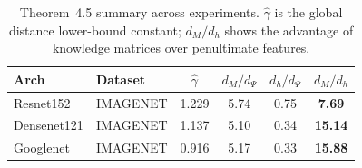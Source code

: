 \begin{table}[t]
\centering
\caption{Theorem~4.5 summary across experiments. $\hat{\gamma}$ is the global distance lower-bound constant; $d_M/d_h$ shows the advantage of knowledge matrices over penultimate features.}
\label{tab:theorem45_summary}
\begin{tabular}{llcccc}
\toprule
Arch & Dataset & $\hat{\gamma}$ & $d_M/d_\Psi$ & $d_h/d_\Psi$ & $d_M/d_h$ \\
\midrule
Resnet152 & IMAGENET & 1.229 & 5.74 & 0.75 & \textbf{7.69} \\
Densenet121 & IMAGENET & 1.137 & 5.10 & 0.34 & \textbf{15.14} \\
Googlenet & IMAGENET & 0.916 & 5.17 & 0.33 & \textbf{15.88} \\
\bottomrule
\end{tabular}
\end{table}